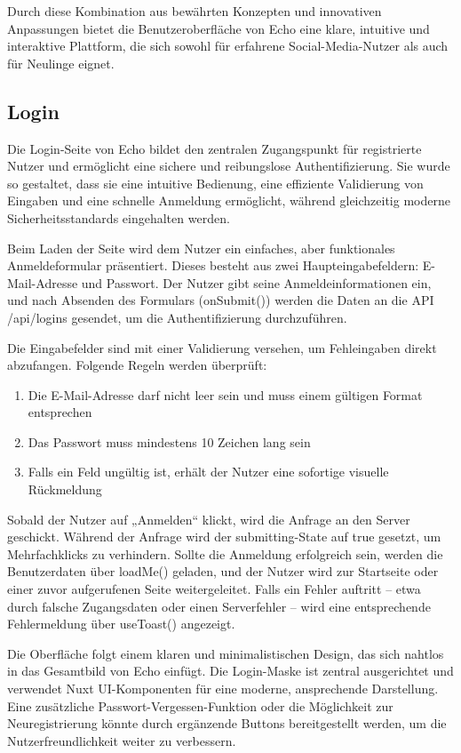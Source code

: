 \documentclass[a4paper,12pt]{article}
\begin{document}
Durch diese Kombination aus bewährten Konzepten und innovativen Anpassungen
bietet die Benutzeroberfläche von Echo eine klare, intuitive und interaktive
Plattform, die sich sowohl für erfahrene Social-Media-Nutzer als auch für
Neulinge eignet.

\subsection{Login}
Die Login-Seite von Echo bildet den zentralen Zugangspunkt für registrierte
Nutzer und ermöglicht eine sichere und reibungslose Authentifizierung. Sie
wurde so gestaltet, dass sie eine intuitive Bedienung, eine effiziente
Validierung von Eingaben und eine schnelle Anmeldung ermöglicht, während
gleichzeitig moderne Sicherheitsstandards eingehalten werden.

Beim Laden der Seite wird dem Nutzer ein einfaches, aber funktionales
Anmeldeformular präsentiert. Dieses besteht aus zwei Haupteingabefeldern:
E-Mail-Adresse und Passwort. Der Nutzer gibt seine Anmeldeinformationen ein,
und nach Absenden des Formulars (onSubmit()) werden die Daten an die API
/api/logins gesendet, um die Authentifizierung durchzuführen.

Die Eingabefelder sind mit einer Validierung versehen, um Fehleingaben direkt
abzufangen. Folgende Regeln werden überprüft:

\begin{enumerate}
    \item Die E-Mail-Adresse darf nicht leer sein und muss einem gültigen
    Format entsprechen
    \item Das Passwort muss mindestens 10 Zeichen lang sein
    \item Falls ein Feld ungültig ist, erhält der Nutzer eine sofortige
        visuelle Rückmeldung
\end{enumerate}

Sobald der Nutzer auf „Anmelden“ klickt, wird die Anfrage an den
Server geschickt. Während der Anfrage wird der submitting-State auf true
gesetzt, um Mehrfachklicks zu verhindern. Sollte die Anmeldung erfolgreich
sein, werden die Benutzerdaten über loadMe() geladen, und der Nutzer wird zur
Startseite oder einer zuvor aufgerufenen Seite weitergeleitet. Falls ein Fehler
auftritt – etwa durch falsche Zugangsdaten oder einen Serverfehler – wird eine
entsprechende Fehlermeldung über useToast() angezeigt.

Die Oberfläche folgt einem klaren und minimalistischen Design, das sich nahtlos
in das Gesamtbild von Echo einfügt. Die Login-Maske ist zentral ausgerichtet
und verwendet Nuxt UI-Komponenten für eine moderne, ansprechende Darstellung.
Eine zusätzliche Passwort-Vergessen-Funktion oder die Möglichkeit zur
Neuregistrierung könnte durch ergänzende Buttons bereitgestellt werden, um die
Nutzerfreundlichkeit weiter zu verbessern.
\end{document}
